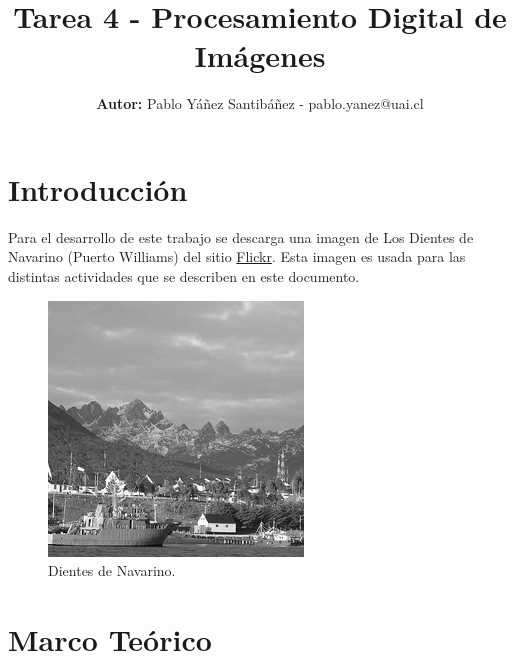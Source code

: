 \documentclass[
  letterpaper,
  twocolumn,
  9pt,
  journal,
  final]{IEEEtran}
\title{Tarea 4 - Procesamiento Digital de Imágenes}
\author{\textbf{Autor:} Pablo Yáñez Santibáñez - pablo.yanez@uai.cl}
\begin{document}
\maketitle


\tableofcontents




\section{Introducción}

Para el desarrollo de este trabajo se descarga una imagen de Los Dientes de Navarino (Puerto Williams) del sitio \href{https://www.flickr.com/photos/whitewizard/7062826349/in/album-72157629780861323/}{Flickr}. Esta imagen es usada para las distintas actividades que se describen en este documento.

\begin{figure}[h!]
	\centering
	\includegraphics[width=0.7\linewidth]{outs/gaussiano/img.jpg}
	\caption{Dientes de Navarino.}
	\label{fig:dientes}
\end{figure}


\section{Marco Teórico}
\end{document}

